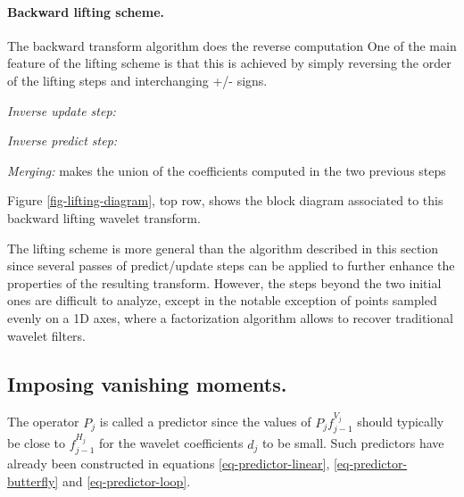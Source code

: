 

\paragraph{Backward lifting scheme.}

The backward transform algorithm does the reverse computation
One of the main feature of the lifting scheme is that this is achieved by simply reversing the order of the lifting steps and interchanging +/- signs.
\begin{rs}
	\item \textit{Inverse update step:} 
	\item \textit{Inverse predict step:} 
	\item \textit{Merging:} makes the union of the coefficients computed in the two previous steps
\end{rs}
Figure \ref{fig-lifting-diagram}, top row, shows the block diagram associated to this backward lifting wavelet transform.
 
The lifting scheme is more general than the algorithm described in this section since several passes of predict/update steps can be applied to further enhance the properties of the resulting transform. However, the steps beyond the two initial ones are difficult to analyze, except in the notable exception of points sampled evenly on a 1D axes, where a factorization algorithm \cite{sweldens-factoring} allows to recover traditional wavelet filters. 



		
\subsection{Imposing vanishing moments.}

The operator $P_j$ is called a predictor since the values of $P_j f_{j-1}^{V_j}$ should typically be close to $f_{j-1}^{H_j}$ for the wavelet coefficients $d_j$ to be small. Such predictors have already been constructed in equations \eqref{eq-predictor-linear}, \eqref{eq-predictor-butterfly} and \eqref{eq-predictor-loop}.

